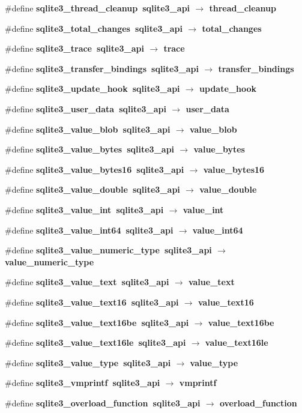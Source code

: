 \begin{CompactItemize}
\item 
\#define \bf{sqlite3\_\-thread\_\-cleanup}~sqlite3\_\-api $\rightarrow$ thread\_\-cleanup
\item 
\#define \bf{sqlite3\_\-total\_\-changes}~sqlite3\_\-api $\rightarrow$ total\_\-changes
\item 
\#define \bf{sqlite3\_\-trace}~sqlite3\_\-api $\rightarrow$ trace
\item 
\#define \bf{sqlite3\_\-transfer\_\-bindings}~sqlite3\_\-api $\rightarrow$ transfer\_\-bindings
\item 
\#define \bf{sqlite3\_\-update\_\-hook}~sqlite3\_\-api $\rightarrow$ update\_\-hook
\item 
\#define \bf{sqlite3\_\-user\_\-data}~sqlite3\_\-api $\rightarrow$ user\_\-data
\item 
\#define \bf{sqlite3\_\-value\_\-blob}~sqlite3\_\-api $\rightarrow$ value\_\-blob
\item 
\#define \bf{sqlite3\_\-value\_\-bytes}~sqlite3\_\-api $\rightarrow$ value\_\-bytes
\item 
\#define \bf{sqlite3\_\-value\_\-bytes16}~sqlite3\_\-api $\rightarrow$ value\_\-bytes16
\item 
\#define \bf{sqlite3\_\-value\_\-double}~sqlite3\_\-api $\rightarrow$ value\_\-double
\item 
\#define \bf{sqlite3\_\-value\_\-int}~sqlite3\_\-api $\rightarrow$ value\_\-int
\item 
\#define \bf{sqlite3\_\-value\_\-int64}~sqlite3\_\-api $\rightarrow$ value\_\-int64
\item 
\#define \bf{sqlite3\_\-value\_\-numeric\_\-type}~sqlite3\_\-api $\rightarrow$ value\_\-numeric\_\-type
\item 
\#define \bf{sqlite3\_\-value\_\-text}~sqlite3\_\-api $\rightarrow$ value\_\-text
\item 
\#define \bf{sqlite3\_\-value\_\-text16}~sqlite3\_\-api $\rightarrow$ value\_\-text16
\item 
\#define \bf{sqlite3\_\-value\_\-text16be}~sqlite3\_\-api $\rightarrow$ value\_\-text16be
\item 
\#define \bf{sqlite3\_\-value\_\-text16le}~sqlite3\_\-api $\rightarrow$ value\_\-text16le
\item 
\#define \bf{sqlite3\_\-value\_\-type}~sqlite3\_\-api $\rightarrow$ value\_\-type
\item 
\#define \bf{sqlite3\_\-vmprintf}~sqlite3\_\-api $\rightarrow$ vmprintf
\item 
\#define \bf{sqlite3\_\-overload\_\-function}~sqlite3\_\-api $\rightarrow$ overload\_\-function

\end{CompactItemize}
